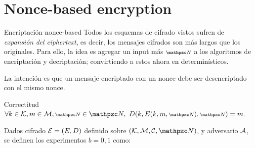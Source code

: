 \section{Nonce-based encryption}
\begin{frame}[allowframebreaks]{Encriptación nonce-based}
  Todos los esquemas de cifrado vistos sufren de \textit{expansión del ciphertext}, es decir,
  los mensajes cifrados son más largos que los originales.
  Para ello, la idea es agregar un input más $\nonce$ a los algoritmos de encriptación y 
  decriptación; convirtiendo a estos ahora en determinísticos.

  La intención es que un mensaje encriptado con un nonce debe ser desencriptado con el mismo 
  nonce.
  \begin{block}{Correctitud}
    $\forall k \in \K, m \in \M, \nonce \in \Nonce,\ D(k, E(k, m, \nonce), \nonce) = m$.
  \end{block}

  \begin{definition}
    Dados cifrado $\mathcal{E} = (E, D)$ definido sobre $(\K, \M, \C, \Nonce)$, y adversario $\mathcal{A}$,
    se definen los experimentos $b = 0,1$ como:

    \begin{centering}
    \end{centering}


\end{definition}
\end{frame}
